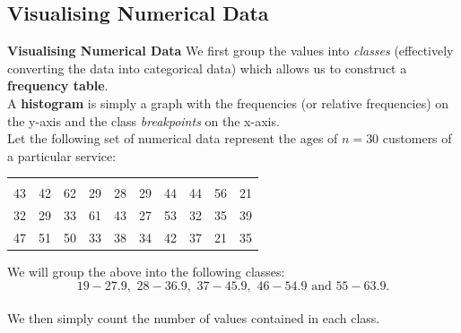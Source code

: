\documentclass[compress]{beamer}        %
\makeatletter
\newcommand{\tcb}{\textcolor{beamer@blendedblue}}
\makeatother
\begin{document}
\subsection{Visualising Numerical Data}
\begin{frame}{\bf \tcb{Visualising Numerical Data}}
We first group the values into \emph{classes} (effectively converting the data into categorical data) which allows us to construct a {\bf frequency table}.\\[0.4cm]
A {\bf histogram} is simply a graph with the frequencies (or relative frequencies) on the y-axis and the class \emph{breakpoints} on the x-axis.\\[0.6cm]
Let the following set of numerical data represent the ages of $n=30$ customers of a particular service:
\begin{center}
\begin{tabular}{|cccccccccc|}
\hline
&&&&&&&&&\\[-0.4cm]
43 & 42 & 62 & 29 & 28 & 29 & 44 & 44 & 56 & 21\\
32 & 29 & 33 & 61 & 43 & 27 & 53 & 32 & 35 & 39\\
47 & 51 & 50 & 33 & 38 & 34 & 42 & 37 & 21 & 35\\
\hline
\end{tabular}
\end{center}
We will group the above into the following classes: \\[-0.4cm]
$$19 - 27.9,\,\, 28 - 36.9,\,\, 37 - 45.9,\,\, 46 - 54.9 \text{ and } 55 - 63.9.$$\\
We then simply count the number of values contained in each class.

\end{frame}
\end{document}

